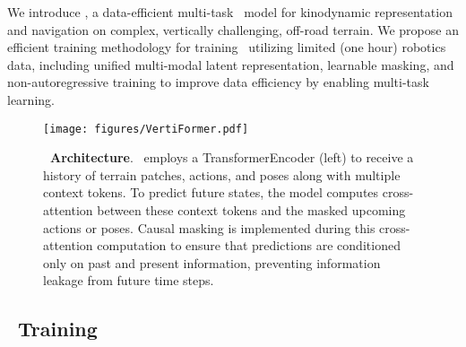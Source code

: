 We introduce \former, a data-efficient multi-task \tr~model for kinodynamic representation and navigation on complex, vertically challenging, off-road terrain. We propose an efficient training methodology for training \former~utilizing limited (one hour) robotics data, including unified multi-modal latent representation, learnable masking, and non-autoregressive training to improve data efficiency by enabling multi-task learning. 

\begin{figure*}
  \centering
  \texttt{[image: figures/VertiFormer.pdf]}
  \caption{\textbf{\former~Architecture}. \former~employs a TransformerEncoder (left) to receive a history of terrain patches, actions, and poses along with multiple context tokens. To predict future states, the model computes cross-attention between these context tokens and the masked upcoming actions or poses. Causal masking is implemented during this cross-attention computation to ensure that predictions are conditioned only on past and present information, preventing information leakage from future time steps.}
  \label{fig:former}
\end{figure*}


\subsection{\former~Training} 
